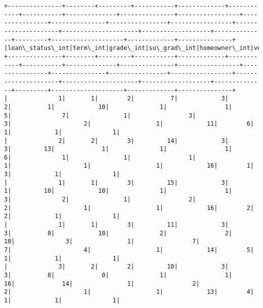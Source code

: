 \documentclass[11pt]{article}
\begin{document}
    \begin{Verbatim}[commandchars=\\\{\}]
+---------------+--------+---------+-----------+-------------+------------+-----------+--------------+---------------+-----------------+----------------+---------------+----------------+-----------------+---------------------+---------------------+-------------------+--------------+---------+--------------------+-------------+---------------+
|loan\_status\_int|term\_int|grade\_int|su\_grad\_int|homeowner\_int|veri\_sta\_int|purpose\_int|emp\_length\_int|loan\_amnt\_strat|funded\_amnt\_strat|annual\_inc\_strat|revol\_bal\_strat|revol\_util\_strat|total\_pymnt\_strat|total\_pymnt\_inv\_strat|total\_rec\_prncp\_strat|total\_rec\_int\_strat|int\_rate\_strat|dti\_strat|inq\_last\_6mths\_strat|pub\_rec\_strat|total\_acc\_strat|
+---------------+--------+---------+-----------+-------------+------------+-----------+--------------+---------------+-----------------+----------------+---------------+----------------+-----------------+---------------------+---------------------+-------------------+--------------+---------+--------------------+-------------+---------------+
|              1|       1|        2|          7|            3|           2|          1|            10|              1|                1|               5|              7|               1|                3|                    3|                    2|                  1|            11|        6|                   1|            1|              1|
|              2|       2|        3|         14|            3|           3|         13|             1|              1|                1|               6|              1|               1|                1|                    1|                    1|                  1|            16|        1|                   3|            1|              1|
|              1|       1|        3|         15|            3|           1|         10|            10|              1|                1|               3|              2|               1|                2|                    2|                    1|                  1|            16|        2|                   2|            1|              1|
|              1|       1|        3|         11|            3|           3|          8|            10|              2|                2|              10|              3|               1|                7|                    7|                    4|                  1|            14|        5|                   1|            1|              1|
|              3|       2|        2|         10|            3|           3|          8|             0|              1|                1|              16|             14|               1|                2|                    2|                    1|                  1|            13|        4|                   1|            1|              1|

\end{Verbatim}
\end{document}
